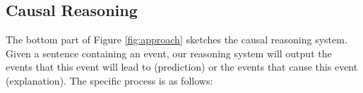 \subsection{Causal Reasoning}
The bottom part of Figure \ref{fig:approach} sketches the causal reasoning system.
Given a sentence containing an event, our reasoning system will output the events that this event will lead to (prediction) or the events that cause this event (explanation). 
The specific process is as follows:

